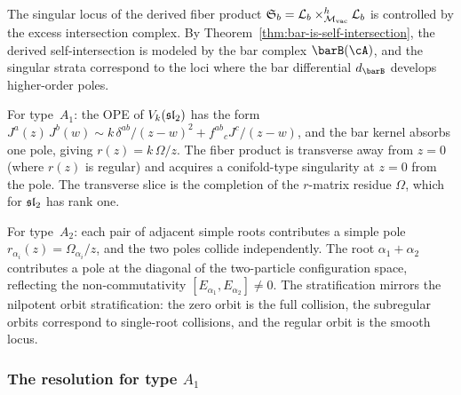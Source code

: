 \begin{remark}[Evidence]
The singular locus of the derived fiber product
$\mathfrak{S}_b = \mathcal{L}_b \times_{{\mathcal{M}_{\mathrm{vac}}}}^h \mathcal{L}_b$ is
controlled by the excess intersection complex. By
Theorem~\ref{thm:bar-is-self-intersection}, the derived
self-intersection is modeled by the bar complex $\barB(\cA)$, and
the singular strata correspond to the loci where the bar differential
$d_{\barB}$ develops higher-order poles.

For type~$A_1$: the OPE of $V_k(\mathfrak{sl}_2)$ has the form
$J^a(z)\,J^b(w) \sim k\,\delta^{ab}/(z-w)^2 + f^{ab}{}_c J^c/(z-w)$,
and the bar kernel absorbs one pole, giving
$r(z) = k\,\Omega/z$. The fiber product is transverse away from $z = 0$
(where $r(z)$ is regular) and acquires a conifold-type singularity at
$z = 0$ from the pole. The transverse slice is the completion of the
$r$-matrix residue $\Omega$, which for $\mathfrak{sl}_2$ has rank one.

For type~$A_2$: each pair of adjacent simple roots contributes a
simple pole $r_{\alpha_i}(z) = \Omega_{\alpha_i}/z$, and
the two poles collide independently. The root
$\alpha_1 + \alpha_2$ contributes a pole at the diagonal of the
two-particle configuration space, reflecting the non-commutativity
$[E_{\alpha_1}, E_{\alpha_2}] \neq 0$. The stratification
mirrors the nilpotent orbit stratification: the zero orbit is
the full collision, the subregular orbits correspond to single-root
collisions, and the regular orbit is the smooth locus.
\end{remark}

\subsubsection{The resolution for type $A_1$}

